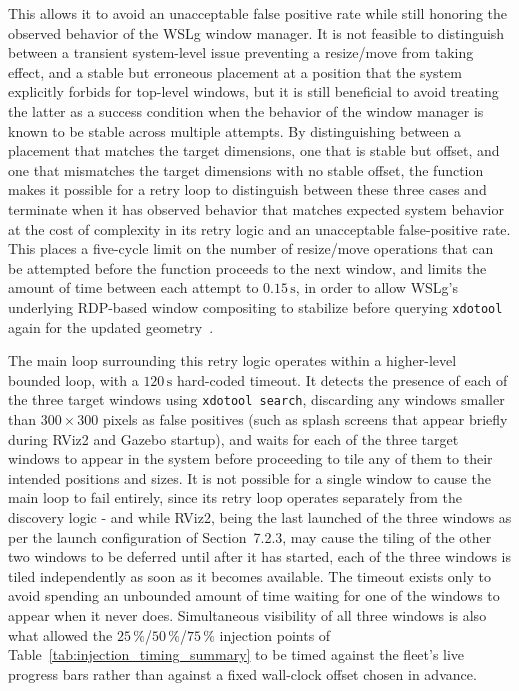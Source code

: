 This allows it to avoid an unacceptable false positive rate while still honoring the observed behavior of the WSLg window manager. It is not feasible to distinguish between a transient system-level issue preventing a resize/move from taking effect, and a stable but erroneous placement at a position that the system explicitly forbids for top-level windows, but it is still beneficial to avoid treating the latter as a success condition when the behavior of the window manager is known to be stable across multiple attempts. By distinguishing between a placement that matches the target dimensions, one that is stable but offset, and one that mismatches the target dimensions with no stable offset, the function makes it possible for a retry loop to distinguish between these three cases and terminate when it has observed behavior that matches expected system behavior at the cost of complexity in its retry logic and an unacceptable false-positive rate. This places a five-cycle limit on the number of resize/move operations that can be attempted before the function proceeds to the next window, and limits the amount of time between each attempt to $0.15\,\text{s}$, in order to allow WSLg's underlying RDP-based window compositing to stabilize before querying \texttt{xdotool} again for the updated geometry~\cite{microsoft2024wslg}.

The main loop surrounding this retry logic operates within a higher-level bounded loop, with a $120\,\text{s}$ hard-coded timeout. It detects the presence of each of the three target windows using \texttt{xdotool search}, discarding any windows smaller than $300\times300$ pixels as false positives (such as splash screens that appear briefly during RViz2 and Gazebo startup), and waits for each of the three target windows to appear in the system before proceeding to tile any of them to their intended positions and sizes. It is not possible for a single window to cause the main loop to fail entirely, since its retry loop operates separately from the discovery logic - and while RViz2, being the last launched of the three windows as per the launch configuration of Section~7.2.3, may cause the tiling of the other two windows to be deferred until after it has started, each of the three windows is tiled independently as soon as it becomes available. The timeout exists only to avoid spending an unbounded amount of time waiting for one of the windows to appear when it never does. Simultaneous visibility of all three windows is also what allowed the $25\,\%$/$50\,\%$/$75\,\%$ injection points of Table~\ref{tab:injection_timing_summary} to be timed against the fleet's live progress bars rather than against a fixed wall-clock offset chosen in advance.

